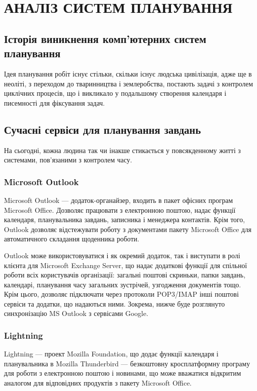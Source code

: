 \section{АНАЛІЗ СИСТЕМ ПЛАНУВАННЯ}
\subsection{Історія виникнення комп’ютерних систем планування}
Ідея планування робіт існує стільки, скільки існує людська цивілізація, адже ще в неоліті, з переходом до тваринництва і землеробства, постають задачі з контролем циклічних процесів, що і викликало у подальшому створення календаря і писемності для фіксування задач.

\subsection{Сучасні сервіси для планування завдань}
На сьогодні, кожна людина так чи інакше стикається у повсякденному житті з системами, пов'язаними з контролем часу.

\subsubsection{Microsoft Outlook}
Microsoft Outlook — додаток-органайзер, входить в пакет офісних програм Microsoft Office. Дозволяє працювати з електронною поштою, надає функції календаря, планувальника завдань, записника і менеджера контактів. Крім того, Outlook дозволяє відстежувати роботу з документами пакету Microsoft Office для автоматичного складання щоденника роботи.

Outlook може використовуватися  і як окремий додаток, так і виступати в ролі клієнта для Microsoft Exchange Server, що надає додаткові функції для спільної роботи всіх користувачів організації: загальні поштові скриньки, папки завдань, календарі, планування часу загальних зустрічей, узгодження документів тощо.
Крім цього, дозволяє підключати через протоколи POP3/IMAP інші поштові сервіси та додатки, що надаються ними. Зокрема, нижче буде розглянуто синхронізацію MS Outlook з сервісами Google.

\subsubsection{Lightning}
Lightning — проект Mozilla Foundation, що додає функції календаря і планувальника в Mozilla Thunderbird — безкоштовну кросплатформну програму для роботи з електронною поштою і новинами, що може вважатися відкритим аналогом для відповідних продуктів з пакету Microsoft Office.


